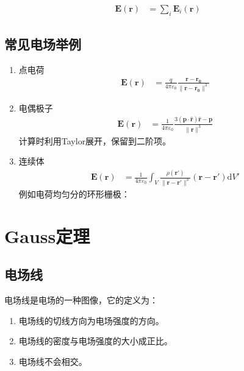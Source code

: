 \documentclass[12pt,onecolumn,a4paper]{book}
\numberwithin{table}{subsection}
\numberwithin{equation}{subsection}
\begin{document}
\begin{align}
    \mathbf{E}(\mathbf{r}) & = \sum_{i} \mathbf{E}_{i}(\mathbf{r})
\end{align}

\subsection{常见电场举例}

\begin{enumerate}
    \item 点电荷
          \begin{align}
              \mathbf{E}(\mathbf{r}) & = \frac{q}{4 \pi \varepsilon_0} \frac{\mathbf{r}-\mathbf{r_{0}}}{\|\mathbf{r}-\mathbf{r_{0}}\|^3}
          \end{align}
    \item 电偶极子
          \begin{align}
              \mathbf{E}(\mathbf{r}) & = \frac{1}{4 \pi \varepsilon_0} \frac{3(\mathbf{p} \cdot \hat{\mathbf{r}}) \hat{\mathbf{r}} - \mathbf{p}}{\|\mathbf{r}\|^3}
          \end{align}
          计算时利用Taylor展开，保留到二阶项。
    \item 连续体
          \begin{align}
              \mathbf{E}(\mathbf{r}) & = \frac{1}{4 \pi \varepsilon_0} \int_{V} \frac{\rho(\mathbf{r'})}{\|\mathbf{r}-\mathbf{r'}\|^3} (\mathbf{r}-\mathbf{r'}) \mathrm{d} V'
          \end{align}
          例如电荷均匀分的环形栅极：


\end{enumerate}

\section{Gauss定理}

\subsection{电场线}

电场线是电场的一种图像，它的定义为：

\begin{enumerate}
    \item 电场线的切线方向为电场强度的方向。
    \item 电场线的密度与电场强度的大小成正比。
    \item 电场线不会相交。
\end{enumerate}
\end{document}

